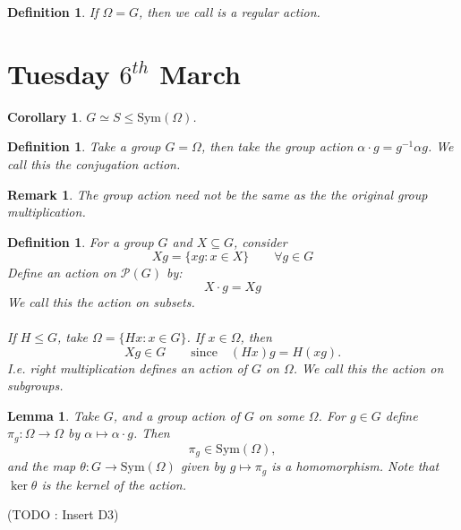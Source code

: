 \documentclass[a4paper,10pt]{article}
\newtheorem{Def}[thm]{Definition}
\newtheorem{Cor}[thm]{Corollary}
\newtheorem{Lem}[thm]{Lemma}
\newtheorem{rem}[thm]{Remark}
\begin{document}
\begin{Def}
If $\Omega = G$, then we call is a regular action. 
\end{Def}

\newpage
\section{Tuesday $6^{th}$ March}

\begin{Cor}
$G \simeq S \leq \text{Sym} (\Omega)$. 
\end{Cor}

\begin{Def}
Take a group $G  =\Omega$, then take the group action $\alpha \cdot g = g^{-1} \alpha g$. We call this the conjugation action. 
\end{Def}
\begin{rem}
The group action need not be the same as the the original group multiplication.
\end{rem}
\begin{Def}
For a group $G$ and $X \subseteq G$, consider
\[ Xg = \{ xg : x \in X \} \qquad \forall g \in G \]
Define an action on $\mathcal{P}(G)$ by:
\[ X\cdot g = Xg \]
We call this the action on subsets. \\
\\
If $H \leq G$, take $\Omega = \{ Hx : x \in G\}$. If $x \in \Omega$, then
\[ Xg \in G \qquad \text{since} \quad (Hx)g = H(xg). \]
I.e. right multiplication defines an action of $G$ on $\Omega$. We call this the action on subgroups.
\end{Def}

\begin{Lem}
Take $G$, and a group action of $G$ on some $\Omega$. For $g \in G$ define $\pi_g : \Omega \rightarrow \Omega$ by $\alpha \mapsto \alpha \cdot g$. Then
\[ \pi_g \in \text{Sym} ( \Omega ), \]
and the map $\theta : G \rightarrow \text{Sym} (\Omega)$ given by $g \mapsto \pi_g$ is a homomorphism. Note that $\ker \theta$ is the kernel of the action.
\end{Lem}

(TODO : Insert D3)
\end{document}

